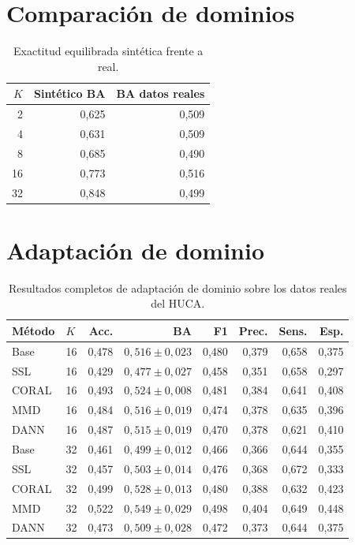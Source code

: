 \section{Comparación de dominios}

\begin{table}[H]
  \centering
  \begin{tabular}{rrr}
    \toprule
    \(K\) & Sintético BA & BA datos reales \\
    \midrule
    2  & 0,625 & 0,509 \\
    4  & 0,631 & 0,509 \\
    8  & 0,685 & 0,490 \\
    16 & 0,773 & 0,516 \\
    32 & 0,848 & 0,499 \\
    \bottomrule
  \end{tabular}
  \caption{Exactitud equilibrada sintética frente a real.}
  \label{tab:app_comparacion_dominios}
\end{table}

\section{Adaptación de dominio}

\begin{table}[H]
  \centering
  \small
  \begin{tabular}{llrrrrrr}
    \toprule
    Método & \(K\) & Acc. & BA & F1 & Prec. & Sens. & Esp. \\
    \midrule
    Base & 16 & 0,478 & \(0,516 \pm 0,023\) & 0,480 & 0,379 & 0,658 & 0,375 \\
    SSL & 16 & 0,429 & \(0,477 \pm 0,027\) & 0,458 & 0,351 & 0,658 & 0,297 \\
    CORAL & 16 & 0,493 & \(0,524 \pm 0,008\) & 0,481 & 0,384 & 0,641 & 0,408 \\
    MMD & 16 & 0,484 & \(0,516 \pm 0,019\) & 0,474 & 0,378 & 0,635 & 0,396 \\
    DANN & 16 & 0,487 & \(0,515 \pm 0,019\) & 0,470 & 0,378 & 0,621 & 0,410 \\
    Base & 32 & 0,461 & \(0,499 \pm 0,012\) & 0,466 & 0,366 & 0,644 & 0,355 \\
    SSL & 32 & 0,457 & \(0,503 \pm 0,014\) & 0,476 & 0,368 & 0,672 & 0,333 \\
    CORAL & 32 & 0,499 & \(0,528 \pm 0,013\) & 0,480 & 0,388 & 0,632 & 0,423 \\
    MMD & 32 & 0,522 & \(0,549 \pm 0,029\) & 0,498 & 0,404 & 0,649 & 0,448 \\
    DANN & 32 & 0,473 & \(0,509 \pm 0,028\) & 0,472 & 0,373 & 0,644 & 0,375 \\
    \bottomrule
  \end{tabular}
  \caption{Resultados completos de adaptación de dominio sobre los datos reales del HUCA.}
  \label{tab:app_domain_completo}
\end{table}


